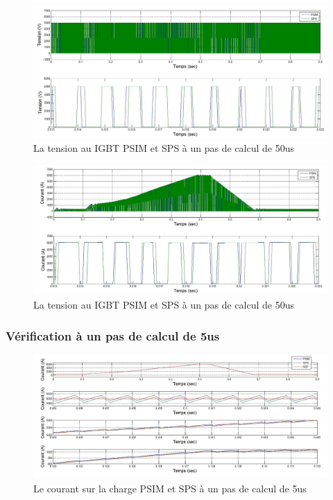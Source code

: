 \documentclass[11pt,letterpaper,final]{report}
\begin{document}
\begin{figure}[h!]
\centering
\includegraphics[scale=0.5]{Fig/Hacheur4Quadrants/HacheurTensionIGBT50u.jpg}
\caption{La tension au IGBT PSIM et SPS à un pas de calcul de 50us}
\label{hc_IG_ten_50}
\end{figure}

\begin{figure}[h!]
\centering
\includegraphics[scale=0.5]{Fig/Hacheur4Quadrants/HacheurCourantIGBT50u.jpg}
\caption{La tension au IGBT PSIM et SPS à un pas de calcul de 50us}
\label{hc_IG_cou_50}
\end{figure}
\clearpage
\subsubsection{Vérification à un pas de calcul de 5us}


\begin{figure}[h!]
\centering
\includegraphics[scale=0.5]{Fig/Hacheur4Quadrants/HacheurCourantCharge5u.jpg}
\caption{Le courant sur la charge PSIM et SPS à un pas de calcul de 5us}
\label{hc_cou_ch_5}
\end{figure}
\end{document}
